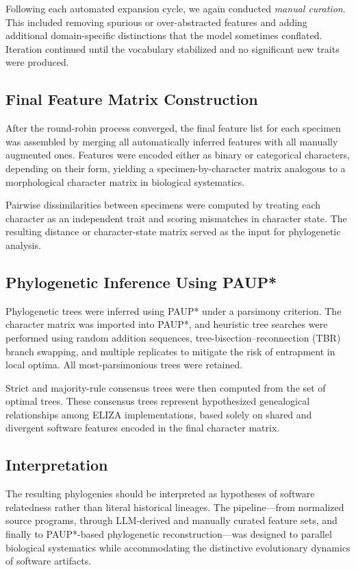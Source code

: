\documentclass{article}
\begin{document}
Following each automated expansion cycle, we again conducted \emph{manual curation}. This included removing spurious or over-abstracted features and adding additional domain-specific distinctions that the model sometimes conflated. Iteration continued until the vocabulary stabilized and no significant new traits were produced.

\subsection{Final Feature Matrix Construction}
After the round-robin process converged, the final feature list for each specimen was assembled by merging all automatically inferred features with all manually augmented ones. Features were encoded either as binary or categorical characters, depending on their form, yielding a specimen-by-character matrix analogous to a morphological character matrix in biological systematics.

Pairwise dissimilarities between specimens were computed by treating each character as an independent trait and scoring mismatches in character state. The resulting distance or character-state matrix served as the input for phylogenetic analysis.

\subsection{Phylogenetic Inference Using PAUP*}
Phylogenetic trees were inferred using PAUP* under a parsimony criterion. The character matrix was imported into PAUP*, and heuristic tree searches were performed using random addition sequences, tree-bisection--reconnection (TBR) branch swapping, and multiple replicates to mitigate the risk of entrapment in local optima. All most-parsimonious trees were retained.

Strict and majority-rule consensus trees were then computed from the set of optimal trees. These consensus trees represent hypothesized genealogical relationships among ELIZA implementations, based solely on shared and divergent software features encoded in the final character matrix.

\subsection{Interpretation}
The resulting phylogenies should be interpreted as hypotheses of software relatedness rather than literal historical lineages. The pipeline---from normalized source programs, through LLM-derived and manually curated feature sets, and finally to PAUP*-based phylogenetic reconstruction---was designed to parallel biological systematics while accommodating the distinctive evolutionary dynamics of software artifacts.
\end{document}
